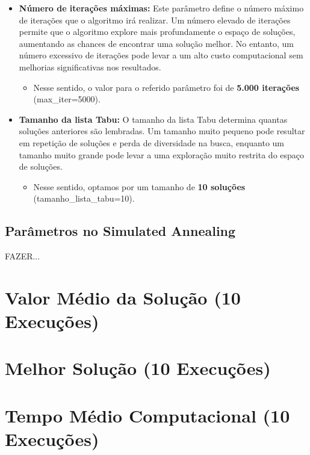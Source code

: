 \documentclass[12pt]{article}
\begin{document}
\begin{itemize}
    \item \textbf{Número de iterações máximas:} Este parâmetro define o número máximo de iterações que o algoritmo irá realizar. Um número elevado de iterações permite que o algoritmo explore mais profundamente o espaço de soluções, aumentando as chances de encontrar uma solução melhor. No entanto, um número excessivo de iterações pode levar a um alto custo computacional sem melhorias significativas nos resultados.
    \begin{itemize}
        \item Nesse sentido, o valor para o referido parâmetro foi de \textbf{5.000 iterações} (max\_iter=5000).
    \end{itemize}
    
    \item \textbf{Tamanho da lista Tabu:} O tamanho da lista Tabu determina quantas soluções anteriores são lembradas. Um tamanho muito pequeno pode resultar em repetição de soluções e perda de diversidade na busca, enquanto um tamanho muito grande pode levar a uma exploração muito restrita do espaço de soluções.
    \begin{itemize}
        \item Nesse sentido, optamos por um tamanho de \textbf{10 soluções} (tamanho\_lista\_tabu=10).
    \end{itemize}
\end{itemize}

\subsection{Parâmetros no Simulated Annealing}

FAZER...


\section{Valor Médio da Solução (10 Execuções)}



\section{Melhor Solução (10 Execuções)}



\section{Tempo Médio Computacional (10 Execuções)}
\end{document}
